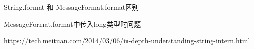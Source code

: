 String.format 和 MessageFormat.format区别


MessageFormat.format中传入long类型时问题









https://tech.meituan.com/2014/03/06/in-depth-understanding-string-intern.html
















































